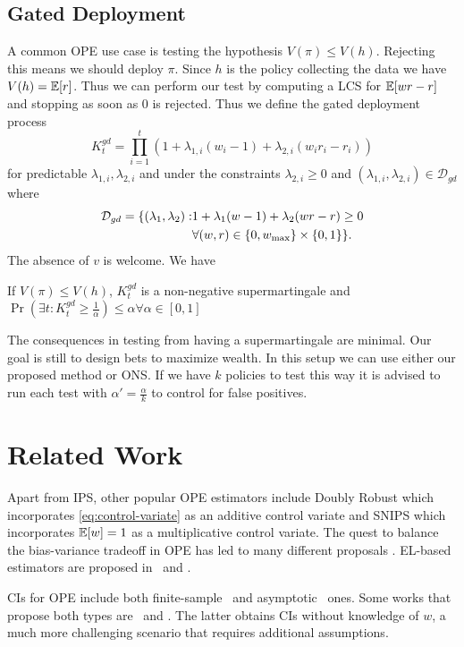 \subsection{Gated Deployment}
A common OPE use case is testing the hypothesis $V(\pi)\leq V(h)$. Rejecting
this means we should deploy $\pi$. Since $h$ is the policy collecting the data
we have $V(h)=\mathbb{E}[r]$. Thus we can perform our test by computing a LCS for
$\mathbb{E}[wr-r]$ and stopping as soon as 0 is rejected.  Thus we define the
gated deployment process
\[
K_t^{gd} = \prod_{i=1}^t \left(1+\lambda_{1,i} (w_i-1) + \lambda_{2,i}(w_ir_i -r_i)\right)  
\]
for predictable $\lambda_{1,i},\lambda_{2,i}$ and under the constraints
$\lambda_{2,i} \geq 0$ and $(\lambda_{1,i},\lambda_{2,i}) \in \mathcal{D}_{gd}$
where
\begin{align}
\mathcal{D}_{gd} = \{(\lambda_{1},\lambda_{2}): & 1+\lambda_1(w-1)+\lambda_2(wr-r)\geq 0 \notag\\
                         & \forall (w,r) \in \{0,w_{\max}\}\times \{0,1\}
\}.
\end{align}
The absence of $v$ is welcome. We have
\begin{theorem}
If $V(\pi)\leq V(h)$, $K_t^{gd}$ is a non-negative supermartingale and $\Pr\left(\exists t: K_t^{gd}\geq \frac{1}{\alpha}\right) \leq \alpha \forall \alpha \in [0,1]$ 
\end{theorem}
The consequences in testing from having a supermartingale are minimal. Our goal
is still to design bets to maximize wealth.  In this setup we can use either
our proposed method or ONS. If we have $k$ policies to test this way it is
advised to run each test with $\alpha'=\frac{\alpha}{k}$ to control for false
positives.

\section{Related Work}
\label{sec:related}

Apart from IPS, other popular OPE estimators include Doubly Robust \cite{RnR,
dudik2011doubly} which incorporates \eqref{eq:control-variate} as an additive
control variate and SNIPS \cite{swaminathan2015self} which incorporates
$\mathbb{E}[w]=1$ as a multiplicative control variate.  The quest to balance the
bias-variance tradeoff in OPE has led to many different proposals \cite{SWITCH,
vlassis2019design}.
EL-based estimators are proposed in~\cite{kallus2019intrinsically} and
\cite{karampatziakis2019empirical}.

CIs for OPE include both finite-sample~\cite{thomas2015high} and
asymptotic~\cite{li2015counterfactual,karampatziakis2019empirical} ones. Some
works that propose both types are~\cite{bottou2013counterfactual} and
\cite{dai2020coindice}. The latter obtains CIs without knowledge of $w$, a much
more challenging scenario that requires additional assumptions.


